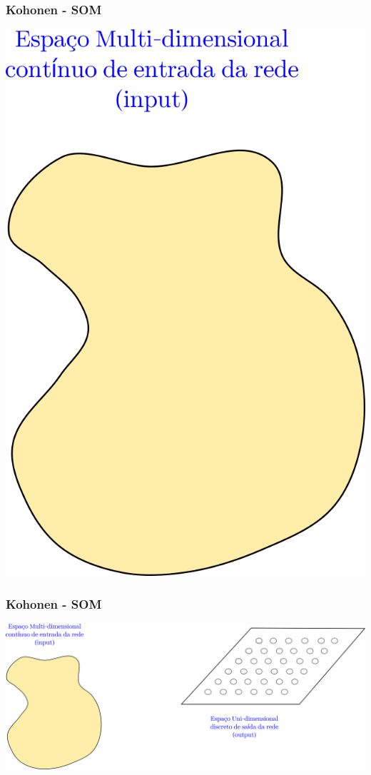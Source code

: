 \documentclass[aspectratio=10]{beamer} %
\begin{document}
\begin{frame}
  \frametitle{Kohonen - SOM}
  	 \includegraphics[scale=0.5]{Imagens/IntroKoho1.png} 
\end{frame}


\begin{frame}
 \frametitle{Kohonen - SOM}
 \includegraphics[scale=0.5]{Imagens/IntroKoho2.png} 
\end{frame}
\end{document}
